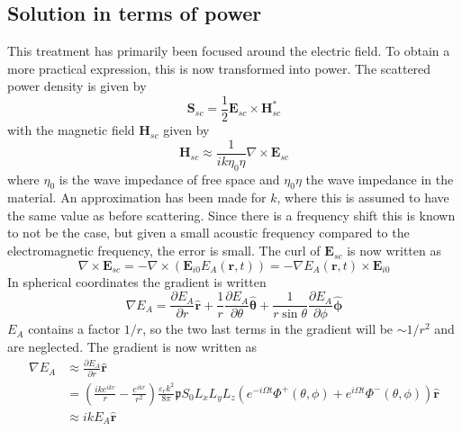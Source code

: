 \documentclass[11pt,twoside]{eitExjobb}
\begin{document}
	\subsection{Solution in terms of power}
	This treatment has primarily been focused around the electric field. To obtain a more practical expression, this is now transformed into power. The scattered power density is given by
	\begin{equation*}
		\bm{S}_{sc} = \frac{1}{2} \bm{E}_{sc} \times \bm{H}_{sc}^*
	\end{equation*}
	with the magnetic field $\bm{H}_{sc}$ given by
	\begin{equation*}
		\bm{H}_{sc} \approx \frac{1}{ik \eta_0 \eta} \nabla \times \bm{E}_{sc}
	\end{equation*}
	where $\eta_0$ is the wave impedance of free space and $\eta_0 \eta$ the wave impedance in the material. An approximation has been made for $k$, where this is assumed to have the same value as before scattering. Since there is a frequency shift this is known to not be the case, but given a small acoustic frequency compared to the electromagnetic frequency, the error is small. The curl of $\bm{E}_{sc}$ is now written as
	\begin{equation*}
		\nabla \times \bm{E}_{sc} = -\nabla \times (\bm{E}_{i0} E_A (\bm{r},t)) = -\nabla E_A (\bm{r},t) \times \bm{E}_{i0}
	\end{equation*}
	In spherical coordinates the gradient is written
	\begin{equation*}
		\nabla E_A = \frac{\partial E_A}{\partial r} \bm{\hat{r}} + \frac{1}{r} \frac{\partial E_A}{\partial \theta} \bm{\hat{\theta}} + \frac{1}{r\sin{\theta}} \frac{\partial E_A}{\partial \phi} \bm{\hat{\phi}}
	\end{equation*}
	$E_A$ contains a factor $1/r$, so the two last terms in the gradient will be $\sim 1/r^2$ and are neglected. The gradient is now written as
	\begin{equation*}
	\begin{split}
		\nabla E_A &\approx \frac{\partial E_A}{\partial r} \bm{\hat{r}} \\
		&= \left( \frac{ike^{ikr}}{r} - \frac{e^{ikr}}{r^2} \right) \frac{\varepsilon_r k^2}{8\pi} \mathfrak{p} S_0 L_x L_y L_z \left( e^{- i\Omega t} \Phi^+ (\theta,\phi) + e^{ i\Omega t} \Phi^- (\theta,\phi) \right) \bm{\hat{r}} \\
		&\approx ikE_A \bm{\hat{r}}
	\end{split}
	\end{equation*}
\end{document}
